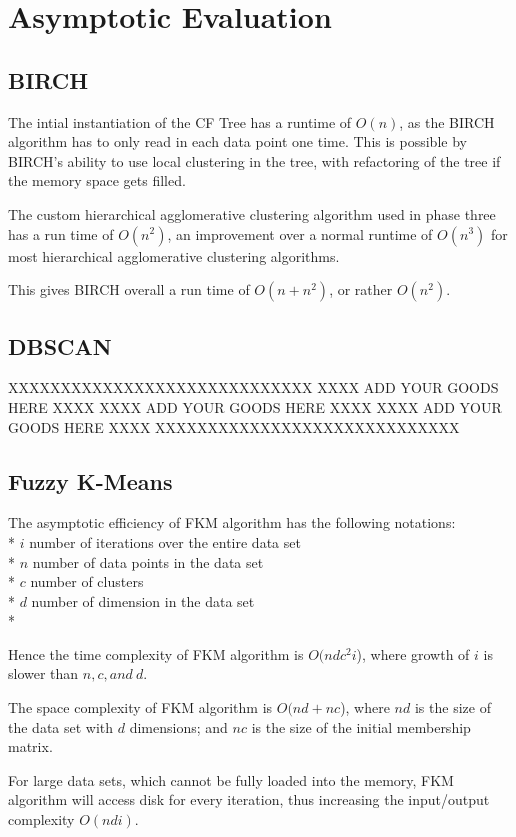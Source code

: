 \documentclass[conference, 10pt]{IEEEtran}
\begin{document}
\section{Asymptotic Evaluation}

\subsection{BIRCH}
The intial instantiation of the CF Tree has a runtime of $O(n)$, as the BIRCH algorithm has to only read in each data point one time. This is possible by BIRCH's ability to use local clustering in the tree, with refactoring of the tree if the memory space gets filled.

The custom hierarchical agglomerative clustering algorithm used in phase three has a run time of $O(n^2)$, an improvement over a normal runtime of $O(n^3)$ for most hierarchical agglomerative clustering algorithms.

This gives BIRCH overall a run time of $O(n+n^2)$, or rather $O(n^2)$.
\subsection{DBSCAN}
XXXXXXXXXXXXXXXXXXXXXXXXXXXXX
XXXX ADD YOUR GOODS HERE XXXX
XXXX ADD YOUR GOODS HERE XXXX
XXXX ADD YOUR GOODS HERE XXXX
XXXXXXXXXXXXXXXXXXXXXXXXXXXXX

\subsection{Fuzzy K-Means}
The asymptotic efficiency of FKM algorithm has the following notations:\\*
$i$ number of iterations over the entire data set\\*
$n$ number of data points in the data set\\*
$c$ number of clusters\\*
$d$ number of dimension in the data set\\*

Hence the time complexity of FKM algorithm is $O(ndc^2i$), where growth of $i$ is slower than $n, c, and\:d$.

The space complexity of FKM algorithm is $O(nd+nc$), where $nd$ is the size of the data set with $d$ dimensions; and $nc$ is the size of the initial membership matrix.

For large data sets, which cannot be fully loaded into the memory, FKM algorithm will access
disk for every iteration, thus increasing the input/output complexity $O(ndi)$.
\end{document}
